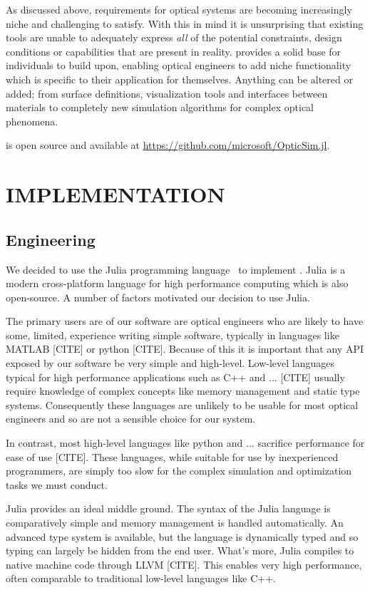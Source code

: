 \documentclass{juliacon}
\begin{document}
As discussed above, requirements for optical systems are becoming increasingly niche and challenging to satisfy.
With this in mind it is unsurprising that existing tools are unable to adequately express \emph{all} of the potential constraints, design conditions or capabilities that are present in reality.
\OpticSim{} provides a solid base for individuals to build upon, enabling optical engineers to add niche functionality which is specific to their application for themselves.
Anything can be altered or added; from surface definitions, visualization tools and interfaces between materials to completely new simulation algorithms for complex optical phenomena.

\OpticSim{} is open source and available at \url{https://github.com/microsoft/OpticSim.jl}.


\section{IMPLEMENTATION}


\subsection{Engineering}

We decided to use the Julia programming language~\cite{julialang} to implement \OpticSim{}.
Julia is a modern cross-platform language for high performance computing which is also open-source.
A number of factors motivated our decision to use Julia.

The primary users are of our software are optical engineers who are likely to have some, limited, experience writing simple software, typically in languages like MATLAB [CITE] or python [CITE].
Because of this it is important that any API exposed by our software be very simple and high-level.
Low-level languages typical for high performance applications such as C++ and ... [CITE] usually require knowledge of complex concepts like memory management and static type systems.
Consequently these languages are unlikely to be usable for most optical engineers and so are not a sensible choice for our system.

In contrast, most high-level languages like python and ... sacrifice performance for ease of use [CITE].
These languages, while suitable for use by inexperienced programmers, are simply too slow for the complex simulation and optimization tasks we must conduct.

Julia provides an ideal middle ground.
The syntax of the Julia language is comparatively simple and memory management is handled automatically.
An advanced type system is available, but the language is dynamically typed and so typing can largely be hidden from the end user.
What's more, Julia compiles to native machine code through LLVM [CITE].
This enables very high performance, often comparable to traditional low-level languages like C++.
\end{document}
